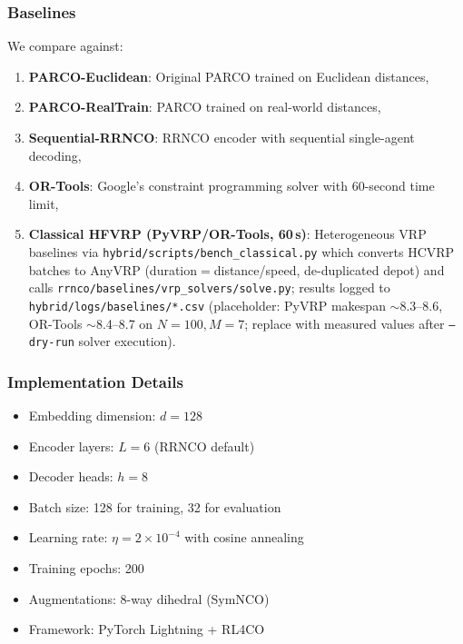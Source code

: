 \documentclass[journal,twoside,web]{ieeecolor}
\theoremstyle{definition}
\theoremstyle{remark}
\theoremstyle{definition}
\begin{document}
\subsubsection{Baselines}
We compare against:
\begin{enumerate}
    \item \textbf{PARCO-Euclidean}: Original PARCO\cite{parco2024} trained on Euclidean distances,
    \item \textbf{PARCO-RealTrain}: PARCO trained on real-world distances,
    \item \textbf{Sequential-RRNCO}: RRNCO\cite{rrnco2025} encoder with sequential single-agent decoding,
    \item \textbf{OR-Tools}: Google's constraint programming solver\cite{ortools} with 60-second time limit,
    \item \textbf{Classical HFVRP (PyVRP/OR-Tools, 60\,s)}: Heterogeneous VRP baselines via \texttt{hybrid/scripts/bench\_classical.py} which converts HCVRP batches to AnyVRP (duration${=}$distance/speed, de-duplicated depot) and calls \texttt{rrnco/baselines/vrp\_solvers/solve.py}; results logged to \texttt{hybrid/logs/baselines/*.csv} (placeholder: PyVRP makespan $\sim$8.3--8.6, OR-Tools $\sim$8.4--8.7 on $N{=}100,M{=}7$; replace with measured values after \texttt{--dry-run} solver execution)\cite{ropke2006adaptive,gendreau2010tabu}.
\end{enumerate}

\subsubsection{Implementation Details}
\begin{itemize}
    \item Embedding dimension: $d = 128$
    \item Encoder layers: $L = 6$ (RRNCO default)
    \item Decoder heads: $h = 8$
    \item Batch size: 128 for training, 32 for evaluation
    \item Learning rate: $\eta = 2 \times 10^{-4}$ with cosine annealing
    \item Training epochs: 200
    \item Augmentations: 8-way dihedral (SymNCO)\cite{kim2022symnco}
    \item Framework: PyTorch Lightning\cite{falcon2019pytorch} + RL4CO\cite{berto2023rl4co}
\end{itemize}
\end{document}
